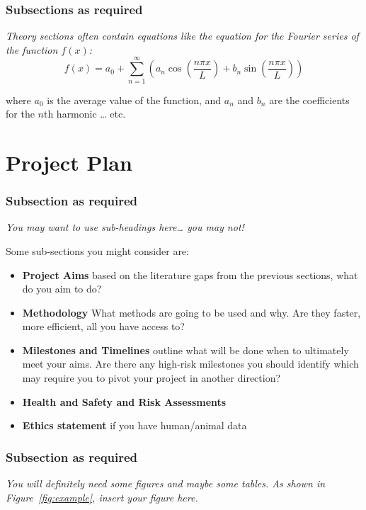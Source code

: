 \documentclass[12pt,openany,a4paper]{book}
\newcommand{\purple}[1]{\textcolor{topicpurple}{\textit{#1}}}
\begin{document}
\subsection{Subsections as required}
{\color{topicpurple}\itshape
Theory sections often contain equations like the equation for the Fourier series of the function \(f(x)\):
\begin{equation}
\label{eq:fourier-series}
f(x)=a_{0}+\sum_{n=1}^{\infty}\left(a_{n}\cos\!\left(\frac{n\pi x}{L}\right)+b_{n}\sin\!\left(\frac{n\pi x}{L}\right)\right)
\end{equation}

where \(a_{0}\) is the average value of the function, and \(a_{n}\) and \(b_{n}\) are the coefficients for the \(n\)th harmonic \dots{} etc.
}
\chapter{Project Plan}

\subsection{Subsection as required}
{\color{topicpurple}\itshape
You may want to use sub-headings here\dots{} you may not!

Some sub-sections you might consider are:
\begin{itemize}
  \item \textbf{Project Aims} based on the literature gaps from the previous sections, what do you aim to do?
  \item \textbf{Methodology} What methods are going to be used and why. Are they faster, more efficient, all you have access to?
  \item \textbf{Milestones and Timelines} outline what will be done when to ultimately meet your aims. Are there any high-risk milestones you should identify which may require you to pivot your project in another direction?
  \item \textbf{Health and Safety and Risk Assessments}
  \item \textbf{Ethics statement} if you have human/animal data
\end{itemize}
}
\subsection{Subsection as required}
\purple{You will definitely need some figures and maybe some tables. As shown in Figure~\ref{fig:example}, \textcolor{topicpurple}{\textit{insert your figure here}}.}
\end{document}
